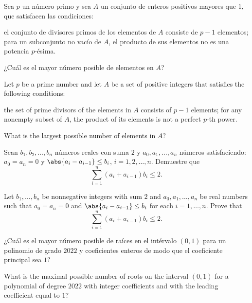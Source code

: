 \begin{problem}[ISL 2003/N8]
	Sea $p$ un número primo y sea $A$ un conjunto de enteros positivos mayores que $1$, que satisfacen las condiciones:
	\begin{enumerate}[(i)]
		\ii el conjunto de divisores primos de los elementos de $A$ consiste de $p-1$ elementos;
		\ii para un subconjunto no vacío de $A$, el producto de sus elementos no es una potencia $p$-ésima.
	\end{enumerate}
	¿Cuál es el mayor número posible de elementos en $A$?
	\begin{hint}
		Let $p$ be a prime number and let $A$ be a set of positive integers that satisfies the following conditions:
		\begin{enumerate}[(i)]
			\ii the set of prime divisors of the elements in $A$ consists of $p-1$ elements;
			\ii for any nonempty subset of $A$, the product of its elements is not a perfect $p$-th power.
		\end{enumerate}
		What is the largest possible number of elements in $A$?
	\end{hint}
\end{problem}

\begin{problem}
	Sean $b_1,b_2,\dots,b_n$ números reales con suma $2$ y $a_0,a_1,\dots,a_n$ números satisfaciendo: $a_0=a_n=0$ y $\abs{a_i-a_{i-1}}\le b_i$, $i=1,2,\dots,n$. Demuestre que
	\[\sum_{i=1}^n(a_i+a_{i-1})b_i\le 2.\]
	\forum[aops]{16127593}
	\begin{hint}
		Let $b_1,\dots,b_n$ be nonnegative integers with sum $2$ and $a_0,a_1,\dots,a_n$ be real numbers such that $a_0=a_n=0$ and $\abs{a_i-a_{i-1}}\le b_i$ for each $i=1,\dots,n$. Prove that
		\[\sum_{i=1}^n(a_i+a_{i-1})b_i\le 2.\]
	\end{hint}
\end{problem}

\begin{problem}
	¿Cuál es el mayor número posible de raíces en el intérvalo $(0,1)$ para un polinomio de grado $2022$ y coeficientes enteros de modo que el coeficiente principal sea $1$?
	\forum[aops]{25217698}
	\begin{hint}
		What is the maximal possible number of roots on the interval $(0,1)$ for a polynomial of degree $2022$ with integer coefficients and with the leading coefficient equal to $1$?
	\end{hint}
\end{problem}


